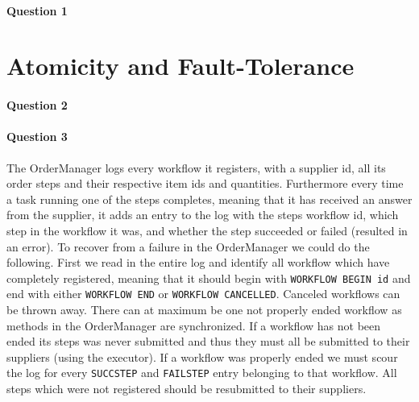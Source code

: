 \documentclass[a4paper, 11pt]{article}
\begin{document}
\paragraph{Question 1} %
\label{par:question_1}



\section{Atomicity and Fault-Tolerance} %
\label{sec:atomicity_and_fault_tolerance}

\paragraph{Question 2} %
\label{par:question_2}


\paragraph{Question 3} %
\label{par:question_3}
The OrderManager logs every workflow it registers, with a supplier id, all its order steps and their respective item ids and quantities. Furthermore every time a task running one of the steps completes, meaning that it has received an answer from the supplier, it adds an entry to the log with the steps workflow id, which step in the workflow it was, and whether the step succeeded or failed (resulted in an error). To recover from a failure in the OrderManager we could do the following. First we read in the entire log and identify all workflow which have completely registered, meaning that it should begin with \texttt{WORKFLOW BEGIN id} and end with either \texttt{WORKFLOW END} or \texttt{WORKFLOW CANCELLED}. Canceled workflows can be thrown away. There can at maximum be one not properly ended workflow as methods in the OrderManager are synchronized. If a workflow has not been ended its steps was never submitted and thus they must all be submitted to their suppliers (using the executor). If a workflow was properly ended we must scour the log for every \texttt{SUCCSTEP} and \texttt{FAILSTEP} entry belonging to that workflow. All steps which were not registered should be resubmitted to their suppliers.

\end{document}
